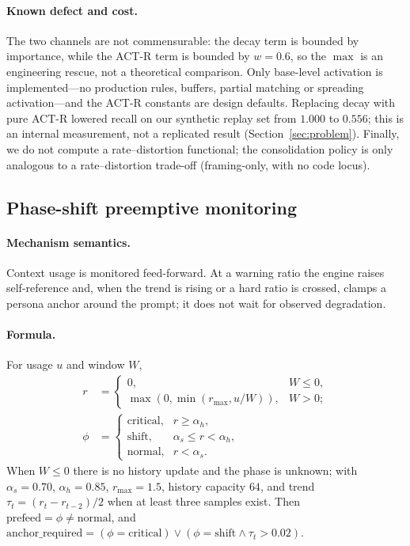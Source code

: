 \paragraph{Known defect and cost.} The two channels are not commensurable: the
decay term is bounded by importance, while the ACT-R term is bounded by
$w=0.6$, so the $\max$ is an engineering rescue, not a theoretical comparison.
Only base-level activation is implemented---no production rules, buffers,
partial matching or spreading activation---and the ACT-R constants are design
defaults. Replacing decay with pure ACT-R lowered recall on our synthetic
replay set from $1.000$ to $0.556$; this is an internal measurement, not a
replicated result (Section~\ref{sec:problem}). Finally, we do not compute a
rate--distortion functional; the consolidation policy is only analogous to a
rate--distortion trade-off (framing-only, with no code locus).

\subsection{Phase-shift preemptive monitoring}\label{sec:method:phase}

\paragraph{Mechanism semantics.} Context usage is monitored feed-forward. At a
warning ratio the engine raises self-reference and, when the trend is rising or
a hard ratio is crossed, clamps a persona anchor around the prompt; it does not
wait for observed degradation.

\paragraph{Formula.} For usage $u$ and window $W$,
{\small
\begin{equation}
\begin{aligned}
r &= \begin{cases}
0, & W \le 0,\\
\max(0, \min(r_{\max}, u/W)), & W > 0;
\end{cases}\\
\phi &= \begin{cases}
\text{critical}, & r \ge \alpha_h,\\
\text{shift}, & \alpha_s \le r < \alpha_h,\\
\text{normal}, & r < \alpha_s.
\end{cases}
\end{aligned}
\end{equation}
}
When $W \le 0$ there is no history update and the phase is unknown; with $\alpha_s=0.70$, $\alpha_h=0.85$, $r_{\max}=1.5$, history capacity $64$, and
trend $\tau_t = (r_t - r_{t-2})/2$ when at least three samples exist. Then
$\mathrm{prefeed} = \phi \ne \text{normal}$, and
$\mathrm{anchor\_required} = (\phi = \text{critical}) \lor
(\phi = \text{shift} \land \tau_t > 0.02)$.

